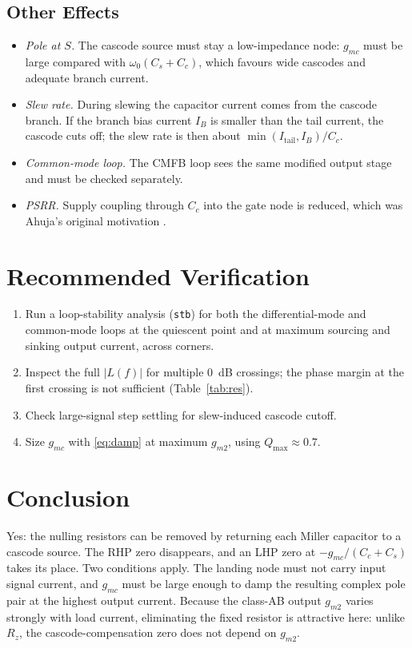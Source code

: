 \documentclass[journal]{IEEEtran}
\newcommand{\gmt}{g_{m2}}
\newcommand{\gmc}{g_{mc}}
\begin{document}
\subsection{Other Effects}
\begin{itemize}
\item \emph{Pole at $S$.} The cascode source must stay a low-impedance node: $\gmc$ must be large compared with $\omega_0(C_s+C_c)$, which favours wide cascodes and adequate branch current.
\item \emph{Slew rate.} During slewing the capacitor current comes from the cascode branch. If the branch bias current $I_B$ is smaller than the tail current, the cascode cuts off; the slew rate is then about $\min(I_{\mathrm{tail}}, I_B)/C_c$.
\item \emph{Common-mode loop.} The CMFB loop sees the same modified output stage and must be checked separately.
\item \emph{PSRR.} Supply coupling through $C_c$ into the gate node is reduced, which was Ahuja's original motivation \cite{ahuja1983,ribner1984}.
\end{itemize}

\section{Recommended Verification}
\begin{enumerate}
\item Run a loop-stability analysis (\texttt{stb}) for both the differential-mode and common-mode loops at the quiescent point and at maximum sourcing and sinking output current, across corners.
\item Inspect the full $|L(f)|$ for multiple \SI{0}{dB} crossings; the phase margin at the first crossing is not sufficient (Table~\ref{tab:res}).
\item Check large-signal step settling for slew-induced cascode cutoff.
\item Size $\gmc$ with \eqref{eq:damp} at maximum $\gmt$, using $Q_{\max}\approx0.7$.
\end{enumerate}

\section{Conclusion}
Yes: the nulling resistors can be removed by returning each Miller capacitor to a cascode source. The RHP zero disappears, and an LHP zero at $-\gmc/(C_c+C_s)$ takes its place. Two conditions apply. The landing node must not carry input signal current, and $\gmc$ must be large enough to damp the resulting complex pole pair at the highest output current. Because the class-AB output $\gmt$ varies strongly with load current, eliminating the fixed resistor is attractive here: unlike $R_z$, the cascode-compensation zero does not depend on $\gmt$.
\end{document}
